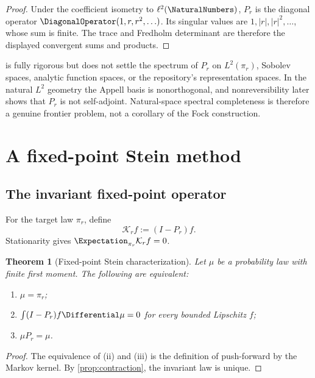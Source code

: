 \documentclass[11pt,a4paper]{article}
\newtheorem{theorem}{Theorem}[section]
\theoremstyle{definition}
\theoremstyle{remark}
\newcommand{\Kcal}{\mathcal K}
\begin{document}
\begin{proof}
Under the coefficient isometry to $\ell^2(\NaturalNumbers)$, $P_r$ is the diagonal operator $\DiagonalOperator(1,r,r^2,\ldots)$. Its singular values are $1,|r|,|r|^2,\ldots$, whose sum is finite. The trace and Fredholm determinant are therefore the displayed convergent sums and products.
\end{proof}

\begin{cautionbox}
 is fully rigorous but does not settle the spectrum of $P_r$ on $L^2(\pi_r)$, Sobolev spaces, analytic function spaces, or the repository's representation spaces. In the natural $L^2$ geometry the Appell basis is nonorthogonal, and nonreversibility later shows that $P_r$ is not self-adjoint. Natural-space spectral completeness is therefore a genuine frontier problem, not a corollary of the Fock construction.
\end{cautionbox}

\section{A fixed-point Stein method}
\label{sec:fixedpoint-stein}

\subsection{The invariant fixed-point operator}

For the target law $\pi_r$, define
\begin{equation}
 \Kcal_r f:=(I-P_r)f.
 \label{eq:fixed-Stein}
\end{equation}
Stationarity gives $\Expectation_{\pi_r}\Kcal_rf=0$.

\begin{theorem}[Fixed-point Stein characterization]
\label{thm:Stein-characterization}
Let $\mu$ be a probability law with finite first moment. The following are equivalent:
\begin{enumerate}[label=(\roman*)]
\item $\mu=\pi_r$;
\item $\int(I-P_r)f\Differential\mu=0$ for every bounded Lipschitz $f$;
\item $\mu P_r=\mu$.
\end{enumerate}
\end{theorem}

\begin{proof}
The equivalence of (ii) and (iii) is the definition of push-forward by the Markov kernel. By \cref{prop:contraction}, the invariant law is unique.
\end{proof}
\end{document}
